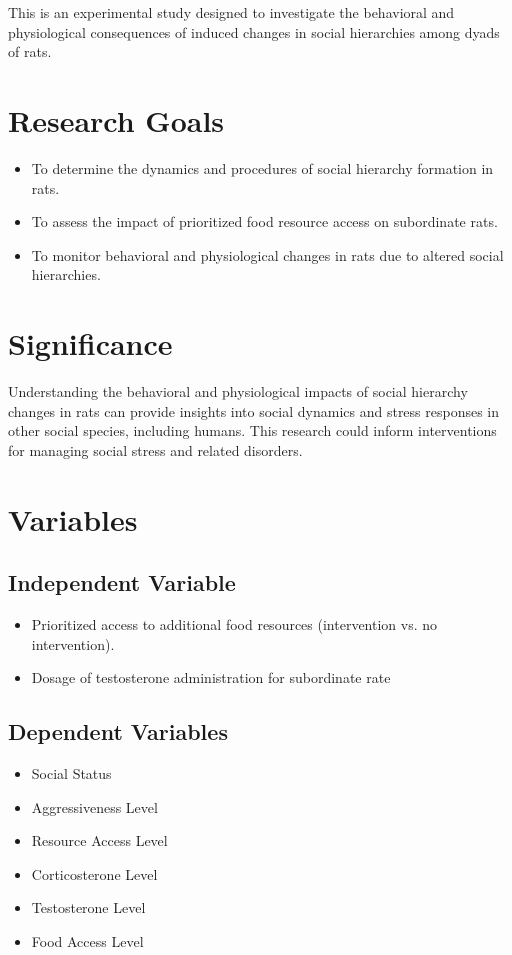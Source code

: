 \documentclass[english, a4paper, 11pt]{article}
\begin{document}
This is an experimental study designed to investigate the behavioral and physiological consequences of induced changes in social hierarchies among dyads of rats.

\section*{Research Goals}

\begin{itemize}
    \item To determine the dynamics and procedures of social hierarchy formation in rats.
    \item To assess the impact of prioritized food resource access on subordinate rats.
    \item To monitor behavioral and physiological changes in rats due to altered social hierarchies.
\end{itemize}

\section*{Significance}

Understanding the behavioral and physiological impacts of social hierarchy changes in rats can provide insights into social dynamics and stress responses in other social species, including humans. This research could inform interventions for managing social stress and related disorders.

\section*{Variables}

\subsection*{Independent Variable}
\begin{itemize}
    \item Prioritized access to additional food resources (intervention vs. no intervention).
    \item Dosage of testosterone administration for subordinate rate
\end{itemize}

\subsection*{Dependent Variables}
\begin{itemize}
    \item Social Status
    \item Aggressiveness Level
    \item Resource Access Level
    \item Corticosterone Level
    \item Testosterone Level
    \item Food Access Level
\end{itemize}
\end{document}
